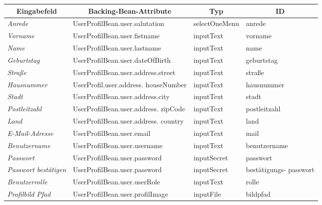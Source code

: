 \begin{itemize}
				\begin{center}
					\begin{longtable}{|p{3cm} |p{6cm} | p{4cm}|p{3cm}|}
						
						\hline \multicolumn{1}{|c|}{\textbf{Eingabefeld}} & \multicolumn{1}{|c|}{\textbf{Backing-Bean-Attribute}} & \multicolumn{1}{|c|}{\textbf{Typ}}  &  \multicolumn{1}{|c|}{\textbf{ID}} \\ \hline
						\endfirsthead
						\hline
						\endlastfoot
						\textit{Anrede} & UserProfilBean.user.salutation & selectOneMenu & anrede \\ \hline
						\textit{Vorname} & UserProfilBean.user.fistname & inputText & vorname \\ \hline
						\textit{Name} & UserProfilBean.user.lastname & inputText & name \\ \hline
						\textit{Geburtstag } & UserProfilBean.user.dateOfBirth & inputText & geburtstag \\ \hline
						\textit{Straße} & UserProfilBean.user.address.street & inputText & straße\\ \hline
						\textit{Hausnummer} & UserProfil.user.address. houseNumber  & inputText & hausnummer\\ \hline
						\textit{Stadt} & UserProfilBean.user.address.city & inputText & stadt \\ \hline
						\textit{Postleitzahl} & UserProfilBean.user.address. zipCode & inputText & postleitzahl \\ \hline
						\textit{Land} & UserProfilBean.user.address. country & inputText & land \\ \hline
						\textit{E-Mail-Adresse} & UserProfilBean.user.email & inputText & mail\\ \hline
						\textit{Benutzername} & UserProfilBean.user.username & inputText & benutzername \\ \hline
						\textit{Passwort} & UserProfilBean.user.password  & inputSecret & passwort \\ \hline
						\textit{Passwort bestätigen} & UserProfilBean.user.password & inputSecret & bestätigungs- passwort \\ \hline
						\textit{Benutzerrolle} & UserProfilBean.user.userRole & inputText & rolle \\ \hline
						\textit{Profilbild Pfad} & UserProfilBean.user.profilImage & inputFile & bildpfad \\ \hline
					\end{longtable}
				\end{center}
				

\end{itemize}
